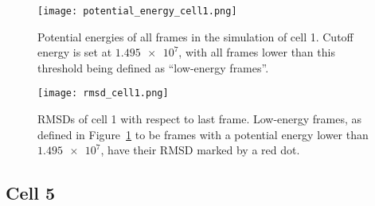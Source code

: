 \begin{figure}[ht]
\centering
  \texttt{[image: potential\_energy\_cell1.png]}
  \caption{Potential energies of all frames in the simulation of cell 1. Cutoff energy is set at \(\num{1.495e7}\), with all frames lower than this threshold being defined as \enquote{low-energy frames}.}
  \label{fig:potential_energy_cell1}
\end{figure}

\begin{figure}[ht]
\centering
  \texttt{[image: rmsd\_cell1.png]}
  \caption{RMSDs of cell 1 with respect to last frame. Low-energy frames, as defined in Figure~\ref{fig:potential_energy_cell1} to be frames with a potential energy lower than \(\num{1.495e7}\), have their RMSD marked by a red dot.}
  \label{fig:rmsd_cell1}
\end{figure}


\FloatBarrier

\subsection{Cell 5} %
\label{sub:cell_5}

